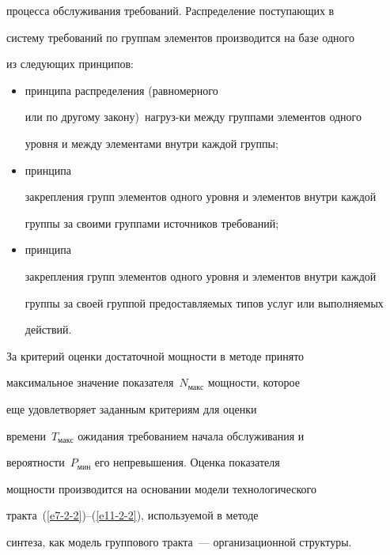 \begin{enumerate}[1.]
процесса обслуживания требований. Распределение поступающих в 


систему требований по группам элементов производится на базе одного 


из следующих принципов: 


\begin{itemize}


\item[(а)] принципа распределения (равномерного 


или по другому закону)\ нагруз-\linebreak ки между группами элементов одного 


уровня и между элементами внутри каждой группы; 


\item[(б)] принципа 


закрепления групп элементов одного уровня и элементов внутри каждой 


группы за своими группами источников требований; 


\item[(в)] принципа 


закрепления групп элементов одного уровня и элементов внутри каждой 


группы за своей группой предоставляемых типов услуг или выполняемых 


действий.


\end{itemize}


        \end{enumerate}


        


        За критерий оценки достаточной мощности в методе принято 


максимальное значение показателя~$N_{\mathrm{макс}}$ мощности, которое 


еще удовлетворяет заданным критериям для оценки 


времени~$T_{\mathrm{макс}}$ ожидания требованием начала обслуживания и 


вероятности~$P_{\mathrm{мин}}$ его непревышения. Оценка показателя 


мощности производится на основании модели технологического 


        тракта~(\ref{e7-2-2})--(\ref{e11-2-2}), используемой в методе 


синтеза, как модель группового тракта~--- организационной структуры. 


